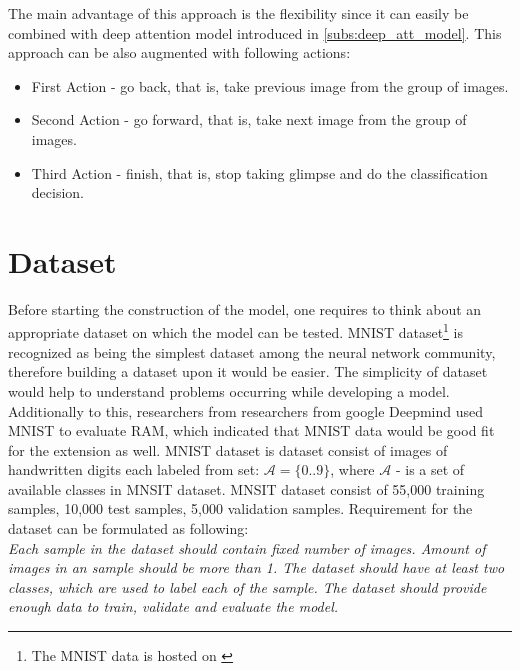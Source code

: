 {The main advantage of this approach is the flexibility since it can easily be combined
with deep attention model introduced in \autoref{subs:deep_att_model}. This
approach can be also augmented with following actions:
\begin{itemize}
	\item First Action - go back, that is, take previous image from the group of images.
	\item Second Action - go forward, that is, take next image from the group of images.
	\item Third Action - finish, that is, stop taking glimpse and do the classification decision.
\end{itemize}


\section{Dataset}

Before starting the construction of the model, one requires to think about an appropriate
dataset on which the model can be tested.
MNIST dataset\footnote{The MNIST data is hosted on \cite{LeCun2010}} is recognized as being the simplest dataset among the neural network
community, therefore building a dataset upon it would be easier. The simplicity of dataset
would help to understand problems occurring while developing a model.
Additionally to this, researchers from researchers from google
Deepmind used MNIST to evaluate RAM, which indicated that MNIST data would
be good fit for the extension as well. \cite{DBLP:journals/corr/MnihHGK14}
MNIST dataset is dataset consist of images of handwritten digits each labeled
from set: $\mathcal{A} = \{0 .. 9\}$, where $\mathcal{A}$ - is a set of available
classes in MNSIT dataset.
MNSIT dataset consist of 55,000 training samples, 10,000 test samples, 5,000 validation samples.
Requirement for the dataset can be formulated as following:\\
\textit{Each sample in the dataset should contain fixed number of images. Amount of images
in an sample should be more than 1. The dataset should have at least two classes,
which are used to label each of the sample. The dataset should provide enough
data to train, validate and evaluate the model.}



}
